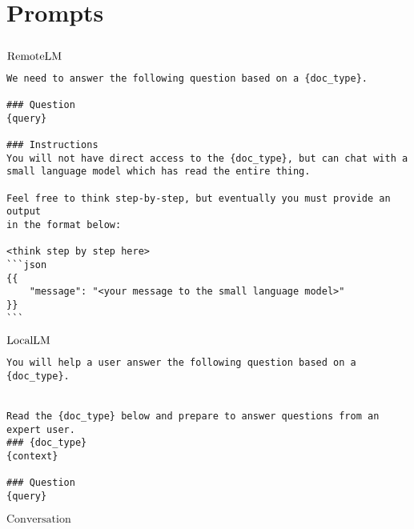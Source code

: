 
\section{Prompts}
\label{app:methods-prompts}


\subsection{\naive}

\textbf{$\mathrm{RemoteLM}$}


\begin{tcolorbox}[colback=gray!10,  width=\textwidth]
\begin{lstlisting}[breaklines]
We need to answer the following question based on a {doc_type}.

### Question
{query}

### Instructions
You will not have direct access to the {doc_type}, but can chat with a small language model which has read the entire thing.

Feel free to think step-by-step, but eventually you must provide an output 
in the format below:

<think step by step here>
```json
{{
    "message": "<your message to the small language model>"
}}
```
\end{lstlisting}
\end{tcolorbox}


\textbf{$\mathrm{LocalLM}$}

\begin{tcolorbox}[colback=gray!10,  width=\textwidth]
\begin{lstlisting}[breaklines]
You will help a user answer the following question based on a {doc_type}. 


Read the {doc_type} below and prepare to answer questions from an expert user. 
### {doc_type}
{context}

### Question
{query}
\end{lstlisting}
\end{tcolorbox}


\textbf{$\mathrm{Conversation}$}

